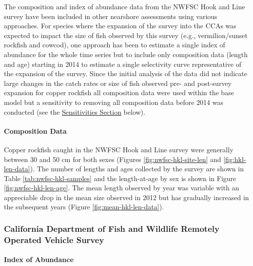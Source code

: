 \documentclass[11pt,
  english,
  letterpaper,
]{article}
\begin{document}
The composition and index of abundance data from the NWFSC Hook and Line survey have been included in other nearshore assessments using various approaches. For species where the expansion of the survey into the CCAs was expected to impact the size of fish observed by this survey (e.g., vermilion/sunset rockfish and cowcod), one approach has been to estimate a single index of abundance for the whole time series but to include only composition data (length and age) starting in 2014 to estimate a single selectivity curve representative of the expansion of the survey. Since the initial analysis of the data did not indicate large changes in the catch rates or size of fish observed pre- and post-survey expansion for copper rockfish all composition data were used within the base model but a sensitivity to removing all composition data before 2014 was conducted (see the \protect\hyperlink{sensitivities}{Sensitivities Section} below).

\hypertarget{composition-data-3}{%
\paragraph{Composition Data}\label{composition-data-3}}

\hfill\break

Copper rockfish caught in the NWFSC Hook and Line survey were generally between 30 and 50 cm for both sexes (Figures \ref{fig:nwfsc-hkl-site-len} and \ref{fig:hkl-len-data}). The number of lengths and ages collected by the survey are shown in Table \ref{tab:nwfsc-hkl-samples} and the length-at-age by sex is shown in Figure \ref{fig:nwfsc-hkl-len-age}. The mean length observed by year was variable with an appreciable drop in the mean size observed in 2012 but has gradually increased in the subsequent years (Figure \ref{fig:mean-hkl-len-data}).

\hypertarget{california-department-of-fish-and-wildlife-remotely-operated-vehicle-survey}{%
\subsubsection{California Department of Fish and Wildlife Remotely Operated Vehicle Survey}\label{california-department-of-fish-and-wildlife-remotely-operated-vehicle-survey}}

\hypertarget{index-of-abundance-2}{%
\paragraph{Index of Abundance}\label{index-of-abundance-2}}
\end{document}
